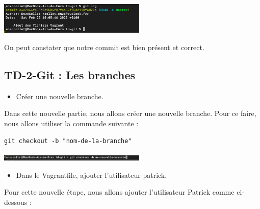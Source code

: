 \documentclass[12pt]{article}
\begin{document}
\vspace{0.3cm}

\begin{center}
  \includegraphics[width=7cm]{Images-TD-Git/Image-TD-Git-1/git-log.png}
\end{center}

\vspace{0.3cm}

On peut constater que notre commit est bien présent et correct.

\newpage

\subsection{TD-2-Git : Les branches}

\vspace{0.3cm}

\begin{itemize}
  \item Créer une nouvelle branche.
\end{itemize}

\vspace{0.3cm}

Dans cette nouvelle partie, nous allons créer une nouvelle branche. Pour ce faire, nous allons utiliser la commande suivante :

\texttt{git checkout -b "nom-de-la-branche"}

\vspace{0.3cm}

\begin{center}
  \includegraphics[width=7cm]{Images-TD-Git/Image-TD-Git-2/git-checkout.png}
\end{center}

\vspace{0.3cm}

\begin{itemize}
  \item Dans le Vagrantfile, ajouter l'utilisateur patrick.
\end{itemize}

\vspace{0.3cm}

Pour cette nouvelle étape, nous allons ajouter l'utilisateur Patrick comme ci-dessous :
\end{document}

